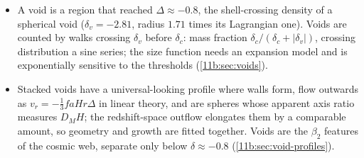 \begin{recap}
\begin{itemize}[leftmargin=1.2em,itemsep=2pt]
        explains the near power-law $\xi_{gg}$ (\cref{11b:sec:halomodel}).
  \item A void is a region that reached $\Delta\approx-0.8$, the shell-crossing
        density of a spherical void ($\delta_v=-2.81$, radius $1.71$ times its
        Lagrangian one). Voids are counted by walks crossing $\delta_v$ before
        $\delta_c$: mass fraction $\delta_c/(\delta_c+|\delta_v|)$, crossing
        distribution a sine series; the size function needs an expansion model and is
        exponentially sensitive to the thresholds (\cref{11b:sec:voids}).
  \item Stacked voids have a universal-looking profile where walls form, flow
        outwards as $v_r=-\frac13faHr\Delta$ in linear theory, and are spheres whose
        apparent axis ratio measures $D_MH$; the redshift-space outflow elongates
        them by a comparable amount, so geometry and growth are fitted together.
        Voids are the $\beta_2$ features of the cosmic web, separate only below
        $\delta\approx-0.8$ (\cref{11b:sec:void-profiles}).
\end{itemize}
\end{recap}
\providecommand{\FBHubN}{}\renewcommand{\FBHubN}{24}
\providecommand{\FBHubKa}{}\renewcommand{\FBHubKa}{424}
\providecommand{\FBHubsKa}{}\renewcommand{\FBHubsKa}{42}
\providecommand{\FBHubSva}{}\renewcommand{\FBHubSva}{229}
\providecommand{\FBHubKb}{}\renewcommand{\FBHubKb}{465}
\providecommand{\FBHubsKb}{}\renewcommand{\FBHubsKb}{56}
\providecommand{\FBHubX}{}\renewcommand{\FBHubX}{-70}
\providecommand{\FBHubsX}{}\renewcommand{\FBHubsX}{79}
\providecommand{\FBHubY}{}\renewcommand{\FBHubY}{236}
\providecommand{\FBHubsY}{}\renewcommand{\FBHubsY}{152}
\providecommand{\FBHubZ}{}\renewcommand{\FBHubZ}{-200}
\providecommand{\FBHubsZ}{}\renewcommand{\FBHubsZ}{82}
\providecommand{\FBHubSvb}{}\renewcommand{\FBHubSvb}{204}
\providecommand{\FBHubVsun}{}\renewcommand{\FBHubVsun}{317}
\providecommand{\FBHubRAsun}{}\renewcommand{\FBHubRAsun}{286}
\providecommand{\FBHubDecsun}{}\renewcommand{\FBHubDecsun}{39}
\providecommand{\FBHubKinv}{}\renewcommand{\FBHubKinv}{520}
\providecommand{\FBHubKmlZero}{}\renewcommand{\FBHubKmlZero}{424}
\providecommand{\FBHubSvmlZero}{}\renewcommand{\FBHubSvmlZero}{224}
\providecommand{\FBHubKmlTwo}{}\renewcommand{\FBHubKmlTwo}{420}
\providecommand{\FBHubSvmlTwo}{}\renewcommand{\FBHubSvmlTwo}{210}
\providecommand{\FBHubKmlFour}{}\renewcommand{\FBHubKmlFour}{397}
\providecommand{\FBHubSvmlFour}{}\renewcommand{\FBHubSvmlFour}{195}
\providecommand{\FBHubBootSa}{}\renewcommand{\FBHubBootSa}{42}
